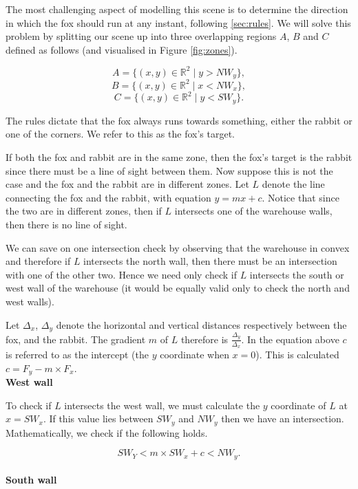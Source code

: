 The most challenging aspect of modelling this scene is to determine the direction in which the fox should run at any instant, following \ref{sec:rules}. We will solve this problem by splitting our scene up into three overlapping regions $A$, $B$ and $C$ defined as follows (and visualised in Figure \ref{fig:zones}). 

$$ A = \{ (x,y) \in \mathbb{R}^2  \mid  y > NW_y \},  $$
$$ B = \{ (x,y) \in \mathbb{R}^2  \mid  x < NW_x \},  $$
$$ C = \{ (x,y) \in \mathbb{R}^2  \mid  y < SW_y \}.  $$



The rules dictate that the fox always runs towards something, either the rabbit or one of the corners. We refer to this as the fox's target.

If both the fox and rabbit are in the same zone, then the fox's target is the rabbit since there must be a line of sight between them. Now suppose this is not the case and the fox and the rabbit are in different zones. Let $L$ denote the line connecting the fox and the rabbit, with equation $y = mx  + c$. Notice that since the two are in different zones, then if $L$ intersects one of the warehouse walls, then there is no line of sight.

We can save on one intersection check by observing that the warehouse in convex and therefore if $L$ intersects the north wall, then there must be an intersection with one of the other two. Hence we need only check if $L$ intersects the south or west wall of the warehouse (it would be equally valid only to check the north and west walls).

Let $\Delta_x$, $\Delta_y$ denote the horizontal and vertical distances respectively between the fox, and the rabbit. The gradient $m$ of $L$ therefore is $\frac{\Delta_y}{\Delta_x}$. In the equation above $c$ is referred to as the intercept (the $y$ coordinate when $x = 0$). This is calculated $c = F_y - m \times F_x$. \\

\noindent \textbf{West wall}

To check if $L$ intersects the west wall, we must calculate the $y$ coordinate of $L$ at $x = SW_x$. If this value lies between $SW_y$ and $NW_y$ then we have an intersection. Mathematically, we check if the following holds.

$$ SW_Y < m \times SW_x + c < NW_y.$$\\

\noindent \textbf{South wall}

